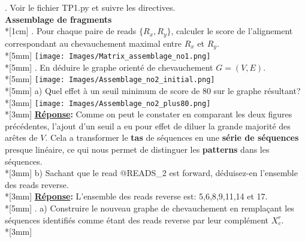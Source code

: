 \documentclass[11pt, letterpaper]{article}
\begin{document}
{. Voir le fichier TP1.py et suivre les directives. \\
\newpage
\textbf{Assemblage de fragments} \\*[1cm]
. Pour chaque paire de reads $\{R_x, R_y \}$, calculer le score de l'alignement correspondant au chevauchement maximal entre $R_x$ et $R_y$. \\*[5mm]
\texttt{[image: Images/Matrix\_assemblage\_no1.png]} \\*[5mm]
. En déduire le graphe orienté de chevauchement $G = (V,E)$. \\*[5mm]
\centering
\texttt{[image: Images/Assemblage\_no2\_initial.png]}\\*[5mm]
\newpage
\flushleft
a) Quel effet à un seuil minimum de score de 80 sur le graphe résultant? \\*[3mm]
\texttt{[image: Images/Assemblage\_no2\_plus80.png]} \\*[3mm]
\textbf{\underline{Réponse}:} Comme on peut le constater en comparant les deux figures précédentes, l'ajout d'un seuil a eu pour effet de diluer la grande majorité des arêtes de $V$. Cela a transformer le \textbf{tas} de séquences en une \textbf{série de séquences} presque linéaire, ce qui nous permet de distinguer les \textbf{patterns} dans les séquences. \\*[3mm]
b) Sachant que le read @READS\_2 est forward, déduisez-en l'ensemble des reads reverse. \\*[3mm]
\textbf{\underline{Réponse}:} L'ensemble des reads reverse est: 5,6,8,9,11,14 et 17. \\*[5mm]
. a) Construire le nouveau graphe de chevauchement en remplaçant les séquences identifiés comme étant des reads reverse par leur complément $X^r_c$. \\*[3mm]

}
\end{document}
